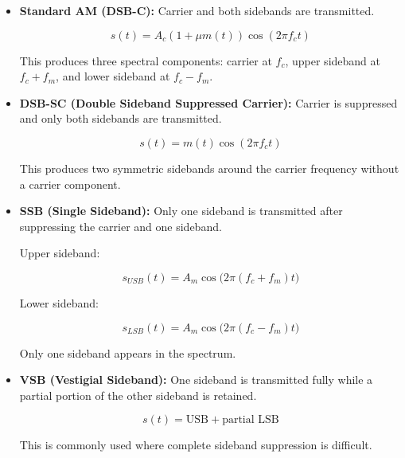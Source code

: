 \documentclass{article}
\begin{document}
\begin{itemize}

\item[$\rightarrow$] \textbf{Standard AM (DSB-C):} Carrier and both sidebands are transmitted.

\begin{equation*}
s(t) = A_c \left(1 + \mu m(t)\right)\cos(2\pi f_c t)
\end{equation*}

This produces three spectral components: carrier at $f_c$, upper sideband at $f_c + f_m$, and lower sideband at $f_c - f_m$.

\item[$\rightarrow$] \textbf{DSB-SC (Double Sideband Suppressed Carrier):} Carrier is suppressed and only both sidebands are transmitted.

\begin{equation*}
s(t) = m(t)\cos(2\pi f_c t)
\end{equation*}

This produces two symmetric sidebands around the carrier frequency without a carrier component.

\item[$\rightarrow$] \textbf{SSB (Single Sideband):} Only one sideband is transmitted after suppressing the carrier and one sideband.

Upper sideband:

\begin{equation*}
s_{USB}(t) = A_m \cos\big(2\pi(f_c + f_m)t\big)
\end{equation*}

Lower sideband:

\begin{equation*}
s_{LSB}(t) = A_m \cos\big(2\pi(f_c - f_m)t\big)
\end{equation*}

Only one sideband appears in the spectrum.

\item[$\rightarrow$] \textbf{VSB (Vestigial Sideband):} One sideband is transmitted fully while a partial portion of the other sideband is retained.

\begin{equation*}
s(t) = \text{USB} + \text{partial LSB}
\end{equation*}

This is commonly used where complete sideband suppression is difficult.

\end{itemize}
\end{document}
